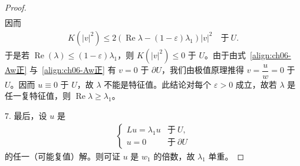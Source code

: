 \documentclass[../../main.tex]{subfiles}
\begin{document}
\begin{proof}
\begin{align*}
\end{align*}
因而
\begin{align*}
K(|v|^{2})\leqslant 2(\operatorname{Re}\lambda-(1-\varepsilon)\lambda_{1})|v|^{2}\quad\text{于}\ U.
\end{align*}
于是若 $\operatorname{Re}(\lambda)\leqslant(1-\varepsilon)\lambda_{1}$，则 $K(|v|^{2})\leqslant 0$ 于 $U$。由于由式~\eqref{align:ch06-Aw正} 与~\eqref{align:ch06-Aw正} 有 $v=0$ 于 $\partial U$，我们由极值原理推得 $v=\dfrac{u}{w}=0$ 于 $U$。因而 $u\equiv 0$ 于 $U$，故 $\lambda$ 不能是特征值。此结论对每个 $\varepsilon>0$ 成立，故若 $\lambda$ 是任一复特征值，则 $\operatorname{Re}\lambda\geqslant\lambda_{1}$。

7. 最后，设 $u$ 是
\begin{align}
\begin{cases}
Lu=\lambda_{1}u & \text{于}\ U,\\
u=0 & \text{于}\ \partial U
\end{cases}
\end{align}
的任一（可能复值）解。则可证 $u$ 是 $w_{1}$ 的倍数，故 $\lambda_{1}$ 单重。
\end{proof}
\end{document}

